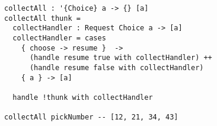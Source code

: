 \begin{algorithm}

\begin{verbatim}
collectAll : '{Choice} a -> {} [a]
collectAll thunk = 
  collectHandler : Request Choice a -> [a]
  collectHandler = cases
    { choose -> resume }  ->
      (handle resume true with collectHandler) ++
      (handle resume false with collectHandler)
    { a } -> [a]

  handle !thunk with collectHandler
  
collectAll pickNumber -- [12, 21, 34, 43]
\end{verbatim}

\caption{Effect handler for Choice that collects all possible results %
\label{alg-eff:choice-collect}}
\end{algorithm}